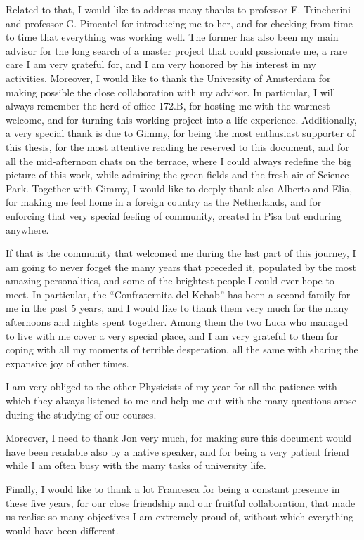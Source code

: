 Related to that, I would like to address many thanks to professor E. Trincherini and professor G. Pimentel for introducing me to her, and for checking from time to time that everything was working well. The former has also been my main advisor for the long search of a master project that could passionate me, a rare care I am very grateful for, and I am very honored by his interest in my activities. 
Moreover, I would like to thank the University of Amsterdam for making possible the close collaboration with my advisor. In particular, I will always remember the herd of office 172.B, for hosting me with the warmest welcome, and for turning this working project into a life experience.
Additionally, a very special thank is due to Gimmy, for being the most enthusiast supporter of this thesis, for the most attentive reading he reserved to this document, and for all the mid-afternoon chats on the terrace, where I could always redefine the big picture of this work, while admiring  the green fields and the fresh air of Science Park.
Together with Gimmy, I would like to deeply thank also Alberto and Elia, for making me feel home in a foreign country as the Netherlands, and for enforcing that very special feeling of community, created in Pisa but enduring anywhere.

If that is the community that welcomed me during the last part of this journey, I am going to never forget the many years that preceded it, populated by the most amazing personalities, and some of the brightest people I could ever hope to meet. In particular, the ``Confraternita del Kebab'' has been a second family for me in the past 5 years, and I would like to thank them very much for the many afternoons and nights spent together.
Among them the two Luca who managed to live with me cover a very special place, and I am very grateful to them for coping with all my moments of terrible desperation, all the same with sharing the expansive joy of other times.

I am very obliged to the other Physicists of my year for all the patience with which they always listened to me and help me out with the many questions arose during the studying of our courses. 

Moreover, I need to thank Jon very much, for making sure this document would have been readable also by a native speaker, and for being a very patient friend while I am often busy with the many tasks of university life.

Finally, I would like to thank a lot Francesca for being a constant presence in these five years, for our close friendship and our fruitful collaboration, that made us realise so many objectives I am extremely proud of, without which everything would have been different.


